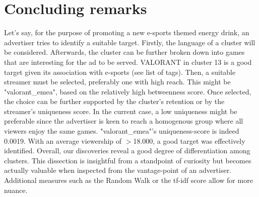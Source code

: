 \documentclass[11pt, oneside]{article}   	%
\begin{document}
\section{Concluding remarks}
Let's say, for the purpose of promoting a new e-sports themed energy drink, an advertiser tries to identify a suitable target. Firstly, the language of a cluster will be considered. Afterwards, the cluster can be further broken down into games that are interesting for the ad to be served. VALORANT in cluster 13 is a good target given its association with e-sports (see list of tags). Then, a suitable streamer must be selected, preferably one with high reach. This might be "valorant\_emea", based on the relatively high betweenness score. Once selected, the choice can be further supported by the cluster's retention or by the streamer's uniqueness score. In the current case, a low uniqueness might be preferable since the advertiser is keen to reach a homogenous group where all viewers enjoy the same games. "valorant\_emea"'s uniqueness-score is indeed 0.0019. With an average viewership of $>$18.000, a good target was effectively identified.
\newline
Overall, our discoveries reveal a good degree of differentiation among clusters. This dissection is insightful from a standpoint of curiosity but becomes actually valuable when inspected from the vantage-point of an advertiser. Additional measures such as the Random Walk or the tf-idf score allow for more nuance.
\clearpage
\end{document}
